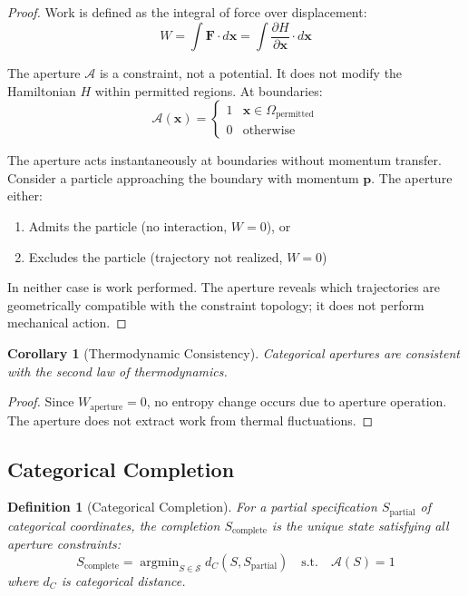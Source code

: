 \documentclass[twocolumn,amsmath,amssymb,aps,prl,superscriptaddress]{revtex4-2}
\newtheorem{corollary}[theorem]{Corollary}
\newtheorem{definition}[theorem]{Definition}
\newcommand{\Sspace}{\mathcal{S}}
\newcommand{\Apert}{\mathcal{A}}
\newcommand{\Wapert}{W_{\text{aperture}}}
\DeclareMathOperator{\argmin}{argmin}
\begin{document}
\begin{proof}
Work is defined as the integral of force over displacement:
\begin{equation}
W = \int \mathbf{F} \cdot d\mathbf{x} = \int \frac{\partial H}{\partial \mathbf{x}} \cdot d\mathbf{x}
\end{equation}

The aperture $\Apert$ is a constraint, not a potential. It does not modify the Hamiltonian $H$ within permitted regions. At boundaries:
\begin{equation}
\Apert(\mathbf{x}) = \begin{cases} 1 & \mathbf{x} \in \Omega_{\text{permitted}} \\ 0 & \text{otherwise} \end{cases}
\end{equation}

The aperture acts instantaneously at boundaries without momentum transfer. Consider a particle approaching the boundary with momentum $\mathbf{p}$. The aperture either:
\begin{enumerate}
\item Admits the particle (no interaction, $W = 0$), or
\item Excludes the particle (trajectory not realized, $W = 0$)
\end{enumerate}

In neither case is work performed. The aperture reveals which trajectories are geometrically compatible with the constraint topology; it does not perform mechanical action.
\end{proof}

\begin{corollary}[Thermodynamic Consistency]
Categorical apertures are consistent with the second law of thermodynamics.
\end{corollary}

\begin{proof}
Since $\Wapert = 0$, no entropy change occurs due to aperture operation. The aperture does not extract work from thermal fluctuations.
\end{proof}

\subsection{Categorical Completion}

\begin{definition}[Categorical Completion]
For a partial specification $S_{\text{partial}}$ of categorical coordinates, the completion $S_{\text{complete}}$ is the unique state satisfying all aperture constraints:
\begin{equation}
S_{\text{complete}} = \argmin_{S \in \Sspace} d_C(S, S_{\text{partial}}) \quad \text{s.t.} \quad \Apert(S) = 1
\end{equation}
where $d_C$ is categorical distance.
\end{definition}
\end{document}
